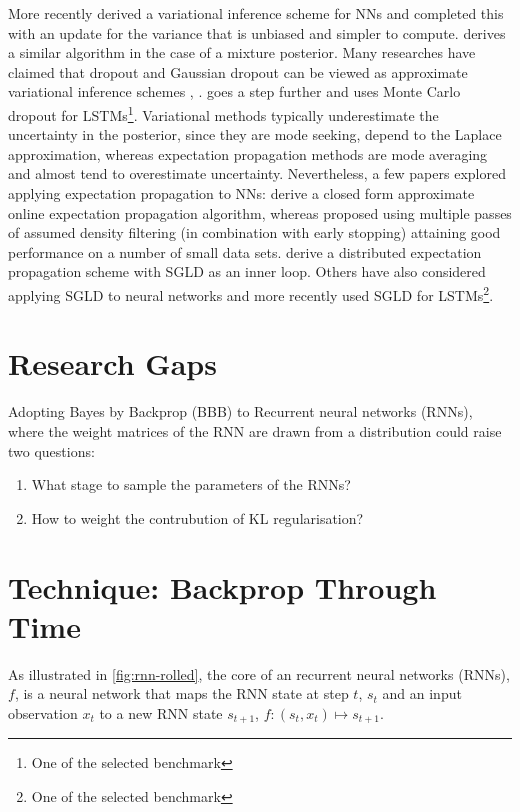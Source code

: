 More recently \cite{Graves2011} derived a variational inference scheme for NNs and
\cite{Blundell2015a} completed this with an update for the variance that is unbiased and simpler to compute.
\cite{Graves2016} derives a similar algorithm in the case of a mixture posterior.
Many researches have claimed that dropout \cite{Srivastava2014} and Gaussian dropout \cite{Wang2013} can be viewed as approximate variational inference schemes \cite{Gal2015}, \cite{Kingma2015}.
\cite{Gan2016} goes a step further and uses Monte Carlo dropout for LSTMs\footnote{One of the selected benchmark}.
Variational methods typically underestimate the uncertainty in the posterior, since they are mode seeking, depend to the Laplace approximation, whereas expectation propagation methods are mode averaging and almost tend to overestimate uncertainty.
Nevertheless, a few papers explored applying expectation propagation to NNs:
\cite{Soudry2014} derive a closed form approximate online expectation propagation algorithm, whereas \cite{Adams2015a} proposed using multiple passes of assumed density filtering (in combination with early stopping) attaining good performance on a number of small data sets.
\cite{Teh2015a} derive a distributed expectation propagation scheme with SGLD \cite{Welling2011} as an inner loop.
Others have also considered applying SGLD to neural networks \cite{Li2016a} and \cite{Gan2016} more recently used SGLD for LSTMs\footnote{One of the selected benchmark}.

\section{Research Gaps}
Adopting Bayes by Backprop (BBB) to Recurrent neural networks (RNNs), where the weight matrices of the RNN are drawn from a distribution could raise two questions:

\begin{enumerate}
	\item What stage to sample the parameters of the RNNs?
	\item How to weight the contrubution of KL regularisation?
\end{enumerate}

\section{Technique: Backprop Through Time}
\label{sec:bptt}

As illustrated in \ref{fig:rnn-rolled}, the core of an recurrent neural networks (RNNs), $f$, is a neural network that maps the RNN state at step $t$, $s_t$ and an input observation $x_t$ to a new RNN state $s_{t+1}$, $f: (s_t, x_t) \mapsto s_{t+1}$.

